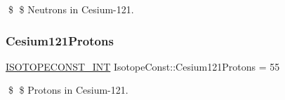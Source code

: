 \$ \$ Neutrons in Cesium-\/121. \mbox{\label{group___isotope_const-_cesium-_cs121_gadf0a6f873b6fd65d3096f97f015611be}} 
\subsubsection{\texorpdfstring{Cesium121\+Protons}{Cesium121Protons}}
{\footnotesize\ttfamily \mbox{\hyperlink{group___isotope_const-_macros_ga5f18360b3e99483a35c32d789e62621c}{I\+S\+O\+T\+O\+P\+E\+C\+O\+N\+S\+T\+\_\+\+I\+NT}} Isotope\+Const\+::\+Cesium121\+Protons = 55}

\$ \$ Protons in Cesium-\/121. 
